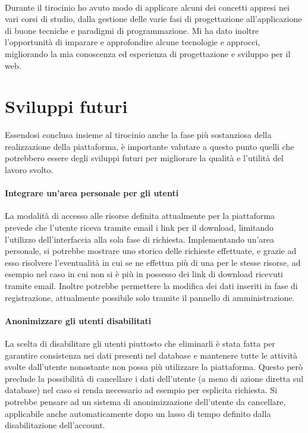 \paragraph{}
Durante il tirocinio ho avuto modo di applicare alcuni dei concetti appresi nei
vari corsi di studio, dalla gestione delle varie fasi di progettazione
all'applicazione di buone tecniche e paradigmi di programmazione. Mi ha dato
inoltre l’opportunità di imparare e approfondire alcune tecnologie e approcci,
migliorando la mia conoscenza ed esperienza di progettazione e sviluppo per il web.



\section{Sviluppi futuri}
Essendosi conclusa insieme al tirocinio anche la fase più sostanziosa della
realizzazione della piattaforma, è importante valutare a questo punto quelli che
potrebbero essere degli sviluppi futuri per migliorare la qualità e l'utilità del
lavoro svolto.

\paragraph{Integrare un'area personale per gli utenti}
La modalità di accesso alle risorse definita attualmente per la piattaforma prevede
che l'utente riceva tramite email i link per il download, limitando l'utilizzo
dell'interfaccia alla sola fase di richiesta.
Implementando un'area personale, si potrebbe mostrare uno storico delle richieste
effettuate, e grazie ad esso risolvere l'eventualità in cui se ne effettua
più di una per le stesse risorse, ad esempio nel caso in cui non si è più in
possesso dei link di download ricevuti tramite email. Inoltre potrebbe permettere
la modifica dei dati inseriti in fase di registrazione, attualmente possibile solo
tramite il pannello di amministrazione.

\paragraph{Anonimizzare gli utenti disabilitati}
La scelta di disabilitare gli utenti piuttosto che eliminarli è stata fatta per
garantire consistenza nei dati presenti nel database e mantenere tutte le attività
svolte dall'utente nonostante non possa più utilizzare la piattaforma.
Questo però preclude la possibilità di cancellare i dati dell'utente (a meno di
azione diretta sul database) nel caso si renda necessario ad esempio per esplicita
richiesta. Si potrebbe pensare ad un sistema di anonimizzazione dell'utente da
cancellare, applicabile anche automaticamente dopo un lasso di tempo definito dalla
disabilitazione dell'account.

